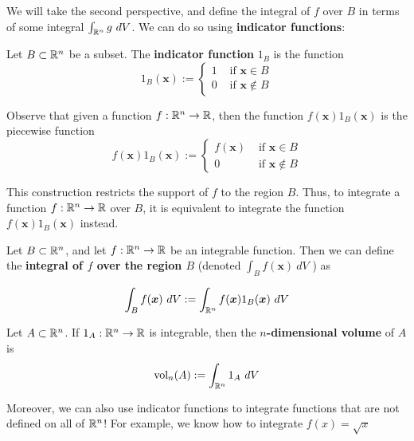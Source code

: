     We will take the second perspective, and define the integral of $f$ over $B$ in terms of some integral $\int_{\R^n} g \ dV$.  We can do so using \textbf{indicator functions}:


    \begin{definition}
    Let $B \subset \mathbb{R}^n$ be a subset.  The \textbf{indicator function} $1_B$ is the function 
    $$1_B(\bm{x}) := \left\{
		\begin{array}{ll}
			1 & \text{ if } \bm{x} \in B \\
			0 & \text{ if } \bm{x} \notin B
		\end{array}
		\right.$$
    
    \end{definition}

    Observe that given a function $f: \mathbb{R}^n \to \mathbb{R}$, then the function $f(\bm{x})1_B(\bm{x})$ is the piecewise function
    $$f(\bm{x})1_B(\bm{x}) := \left\{
		\begin{array}{ll}
			f(\bm{x}) & \text{ if } \bm{x} \in B \\
			0 & \text{ if } \bm{x} \notin B
		\end{array}
		\right.$$

    This construction restricts the support of $f$ to the region $B$.  Thus, to integrate a function $f: \mathbb{R}^n \to \mathbb{R}$ over $B$, it is equivalent to integrate the function $f(\bm{x})1_B(\bm{x})$ instead.

    \begin{definition}
     Let $B \subset \mathbb{R}^n$, and let $f : \mathbb{R}^n \to \mathbb{R}$ be an integrable function.  Then we can define the \textbf{integral of $f$ over the region $B$} (denoted $\int_B f(\bm{x}) \ dV$ )   as

    $$\int_B f(\bm{x}) \ dV := \int_{\mathbb{R}^n} f(\bm{x})1_B(\bm{x}) \ dV$$
     
    \end{definition}
    

    \begin{definition}
    Let $A \subset \mathbb{R}^n$.  If $1_A : \mathbb{R}^n \to \mathbb{R}$ is integrable, then the $n$\textbf{-dimensional volume} of $A$ is $$\textnormal{vol}_n(A) := \int_{\mathbb{R}^n} 1_A \ dV$$
    \end{definition}





    Moreover, we can also use indicator functions to integrate functions that are not defined on all of $\mathbb{R}^n$!  For example, we know how to integrate $f(x) = \sqrt{x}$
    
